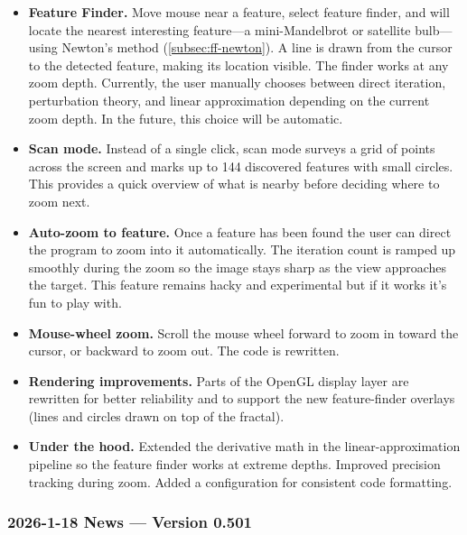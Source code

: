 \begin{itemize}
\item \textbf{Feature Finder.}  Move mouse near a feature, select feature
  finder, and \FractalShark{} will locate the nearest interesting feature---a
  mini-Mandelbrot or satellite bulb---using Newton's method (\cref{subsec:ff-newton}).  A line is drawn
  from the cursor to the detected feature, making its location visible.
  The finder works at any zoom depth.  Currently, the user manually chooses between
  direct iteration, perturbation theory, and linear approximation depending on
  the current zoom depth.  In the future, this choice will be automatic.

\item \textbf{Scan mode.}  Instead of a single click, scan mode surveys a grid
  of points across the screen and marks up to 144 discovered features with small
  circles.  This provides a quick overview of what is nearby before deciding
  where to zoom next.

\item \textbf{Auto-zoom to feature.}  Once a feature has been found the user can direct
  the program to zoom into it automatically.  The iteration count is ramped up
  smoothly during the zoom so the image stays sharp as the view approaches the target.
  This feature remains hacky and experimental but if it works it's fun to
  play with.

\item \textbf{Mouse-wheel zoom.}  Scroll the mouse wheel forward to zoom in
  toward the cursor, or backward to zoom out.  The code is rewritten.

\item \textbf{Rendering improvements.}  Parts of the OpenGL display layer are
  rewritten for better reliability and to support the new feature-finder
  overlays (lines and circles drawn on top of the fractal).

\item \textbf{Under the hood.}  Extended the derivative math in the
  linear-approximation pipeline so the feature finder works at extreme depths.
  Improved precision tracking during zoom.  Added a 
  configuration for consistent code formatting.
\end{itemize}

\subsubsection{2026-1-18 News --- Version 0.501}

